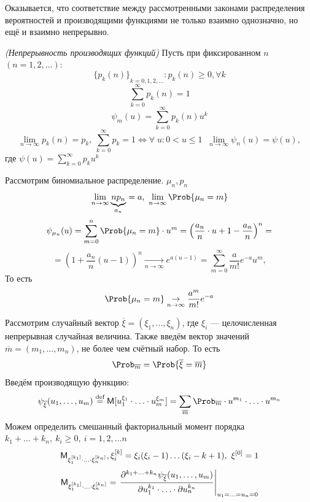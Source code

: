Оказывается, что соответствие между рассмотренными законами распределения вероятностей и производящими функциями не только взаимно однозначно, но ещё и взаимно непрерывно.
\begin{theorem} \textit{(Непрерывность производящих функций)} 
	Пусть при фиксированном $n$ $(n = 1, 2, \ldots)$:
	\[
		{\{ p_k (n) \}}_{k = 0, 1, 2, \ldots} : p_k (n) \geqslant 0, \forall k
	\]
	\[
		\sum\limits_{k = 0}^{\infty} p_k (n) = 1
	\]
	\[
		\psi_m (u) = \sum\limits_{k = 0}^{\infty} p_k (n) u^k
	\]
	\[
		\lim\limits_{n \to \infty} p_k (n) = p_k, \ \sum\limits_{k = 0}^{\infty} p_k = 1 \Leftrightarrow \forall \; u:  0 < u \leqslant 1 \;\; \lim\limits_{n \to \infty} \psi_n (u) = \psi (u),
	\]
	где $\psi (u) = \sum\limits_{k = 0}^{\infty} p_k u^k$
\end{theorem}
\begin{example}
	Рассмотрим биномиальное распределение. $\mu_n, p_n$
	\[
		\lim\limits_{n \to \infty} \underbrace{n p_n}_{a_n} = a, \ \lim\limits_{n \to \infty} \Prob \{ \mu_n = m \}
	\]
	\[
		\psi_{\mu_n} (u) = \sum\limits_{m = 0}^{n} \Prob \{ \mu_n = m \} \cdot u^m = \left( \frac{a_n}{n} \cdot u + 1 - \frac{a_n}{n} \right)^n =
	\]
	\[
		= \left( 1 + \frac{a_n}{n} (u - 1) \right)^n \underset{n \to \infty}{\rightarrow} e^{a(u - 1)} = \sum\limits_{m = 0}^{\infty} \frac{a}{m!} e^{-a} u^m,
	\]
	То есть
	\[
		\Prob \{ \mu_n = m \} \underset{n \to \infty}{\rightarrow} \frac{a^m}{m!} e^{-a}
	\]
\end{example}
Рассмотрим случайный вектор $\overline{\xi} = (\xi_1, \ldots, \xi_n)$, где $\xi_i$ --- целочисленная непрерывная случайная величина. Также введём вектор значений $\overline{m} = (m_1, \ldots, m_n)$, не более чем счётный набор. То есть
\[
	\Prob_{\overline{m}} = \Prob \{ \overline{\xi} = \overline{m} \}
\]
Введём производящую функцию:
\[
	\psi_{\overline{\xi}} (u_1, \ldots, u_m) \overset{\textrm{def}}{=} \MExpect [u_1^{\xi_1} \cdot \ldots \cdot u_m^{\xi_m}] = \sum\limits_{\overline{m}} \Prob_{\overline{m}} \cdot u^{m_1} \cdot \ldots \cdot u^{m_n}
\]
Можем определить смешанный факториальный момент порядка $k_1 + \ldots + k_n, \ k_i \geqslant 0, \ i = 1, 2, \ldots n$
\[
	\mathsf{M}_{\xi_1^{[k_1]} \cdot \ldots \cdot \xi_n^{[k_n]}}, \xi_i^{[k]} = \xi_i (\xi_i - 1) \ldots (\xi_i - k + 1), \ \xi^{[0]} = 1
\]
\[
	\mathsf{M}_{\xi_1^{[k_1]} \cdot \ldots \cdot \xi_n^{[k_n]}} = 
\left. \frac{ \partial^{k_1 + \ldots + k_n} \psi_{\overline{\xi}} (u_1, \ldots, u_m) }{ \partial u_1^{k_1} \cdot \ldots \cdot \partial u_n^{k_n} } \right|_{u_1 = \ldots = u_n = 0}
\]

